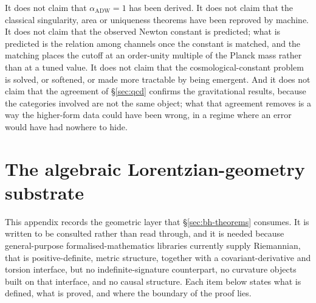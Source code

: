 \documentclass[aps,prd,nofootinbib,superscriptaddress,12pt]{revtex4-2}
\begin{document}
It does not claim that $\alpha_{\mathrm{ADW}} = 1$ has been derived. It does not
claim that the classical singularity, area or uniqueness theorems have been
reproved by machine. It does not claim that the observed Newton constant is
predicted; what is predicted is the relation among channels once the constant is
matched, and the matching places the cutoff at an order-unity multiple of the
Planck mass rather than at a tuned value. It does not claim that the
cosmological-constant problem is solved, or softened, or made more tractable by
being emergent. And it does not claim that the agreement of \S\ref{sec:qcd}
confirms the gravitational results, because the categories involved are not the
same object; what that agreement removes is a way the higher-form data could
have been wrong, in a regime where an error would have had nowhere to hide.

\appendix

\section{The algebraic Lorentzian-geometry substrate}
\label{app:lorentzian-substrate}

This appendix records the geometric layer that
\S\ref{sec:bh-theorems} consumes. It is written to be consulted rather than read
through, and it is needed because general-purpose formalised-mathematics
libraries currently supply Riemannian, that is positive-definite, metric
structure, together with a covariant-derivative and torsion interface, but no
indefinite-signature counterpart, no curvature objects built on that interface,
and no causal structure. Each item below states what is defined, what is proved,
and where the boundary of the proof lies.
\end{document}
